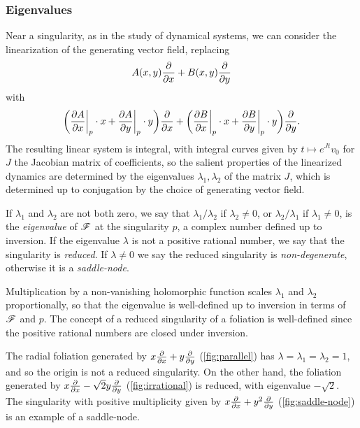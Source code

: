 \subsubsection{Eigenvalues}

Near a singularity, as in the study of dynamical systems, we can consider the
linearization of the generating vector field, replacing
\begin{equation*}
    A(x,y)\pdv{}{x} + B(x,y)\pdv{}{y}
\end{equation*}
with
\begin{equation*}
    \biggl(\pdv{A}{x}\bigg|_p\cdot x+\pdv{A}{y}\bigg|_p\cdot y\biggr)\pdv{}{x}
        + \biggl(\pdv{B}{x}\bigg|_p\cdot x+\pdv{B}{y}\bigg|_p\cdot y\biggr)
            \pdv{}{y}.
\end{equation*}
The resulting linear system is integral, with integral curves given by
$t\mapsto e^{Jt}v_0$ for $J$ the Jacobian matrix of coefficients, so the salient
properties of the linearized dynamics are determined by the eigenvalues
$\lambda_1,\lambda_2$ of the matrix $J$, which is determined up to conjugation
by the choice of generating vector field.

\begin{definition}
    If $\lambda_1$ and $\lambda_2$ are not both zero, we say that
    $\lambda_1/\lambda_2$ if $\lambda_2\ne0$, or $\lambda_2/\lambda_1$ if
    $\lambda_1\ne0$, is the \emph{eigenvalue} of $\mathscr{F}$ at the singularity $p$,
    a complex number defined up to inversion. If the eigenvalue $\lambda$ is not
    a positive rational number, we say that the singularity is \emph{reduced}.
    If $\lambda\ne0$ we say the reduced singularity is \emph{non-degenerate},
    otherwise it is a \emph{saddle-node}.
\end{definition}

\begin{remark}
    Multiplication by a non-vanishing holomorphic function scales $\lambda_1$
    and $\lambda_2$ proportionally, so that the eigenvalue is well-defined up to
    inversion in terms of $\mathscr{F}$ and $p$. The concept of a reduced singularity
    of a foliation is well-defined since the positive rational numbers are
    closed under inversion.
\end{remark}

\begin{example}
    The radial foliation generated by $x\pdv{}{x}+y\pdv{}{y}$
    (\cref{fig:parallel}) has $\lambda=\lambda_1=\lambda_2=1$, and so the origin
    is not a reduced singularity. On the other hand, the foliation generated by
    $x\pdv{}{x}-\sqrt2y\pdv{}{y}$ (\cref{fig:irrational}) is reduced, with
    eigenvalue $-\sqrt2$. The singularity with positive multiplicity given
    by $x\pdv{}{x}+y^2\pdv{}{y}$ (\cref{fig:saddle-node}) is an example of a
    saddle-node.
\end{example}

